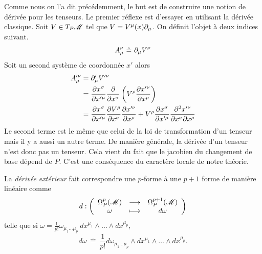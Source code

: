 \documentclass[a4paper,11pt]{report}
\begin{document}
            Comme nous on l'a dit précédemment, le but est de construire une notion de dérivée pour les tenseurs. Le premier réflexe est d'essayer en utilisant la dérivée classique. Soit $V\in T_P\mathscr{M}$ tel que $V = V^\mu(x) \partial_\mu$. On définit l'objet à deux indices suivant.
            \begin{equation}
                A_\mu^\nu ~\hat{=}~ \partial_\mu V^\nu
            \end{equation}
            Soit un second système de coordonnée $x'$ alors 
            \begin{align}
                A'^\nu_\mu &= \partial'_\mu V'^\nu \\
                &= \pdv{x^\sigma}{x'^\mu}\pdv{}{x^\sigma}\left( V^\rho \pdv{x'^\nu}{x^\rho} \right)\\
                &= \pdv{x^\sigma}{x'^\mu}\pdv{V^\rho}{x^\sigma}\pdv{x'^\nu}{x^\rho}+V^\rho\pdv{x^\sigma}{x'^\mu}  \pdv{x'^\nu}{x^\sigma}{x^\rho}
            \end{align}
            Le second terme est le même que celui de la loi de transformation d'un tenseur mais il y a aussi un autre terme. De manière générale, la dérivée d'un tenseur n'est donc pas un tenseur. Cela vient du fait que le jacobien du changement de base dépend de $P$. C'est une conséquence du caractère locale de notre théorie.
            
            \begin{defn}
                La \textit{dérivée extérieur} fait correspondre une $p$-forme à une $p+1$ forme de manière linéaire comme
                \begin{equation}
                d:\left(
                \begin{array}{ccc}
                    \Omega_P^p(\mathscr{M}) & \longrightarrow & \Omega_P^{p+1}(\mathscr{M}) \\
                    \omega & \longmapsto & d\omega
                \end{array}
                \right)
                \end{equation}
                telle que si $\omega = \frac{1}{p!}\omega_{\mu_1\dots\mu_p}~dx^{\mu_1}\wedge \dots\wedge dx^{\mu_p}$,
                \begin{equation}
                    d\omega ~\hat{=}~ \frac{1}{p!} d\omega_{\mu_1\dots\mu_p}\wedge dx^{\mu_1}\wedge \dots\wedge dx^{\mu_p}.
                \end{equation}
            \end{defn}
            
\end{document}
